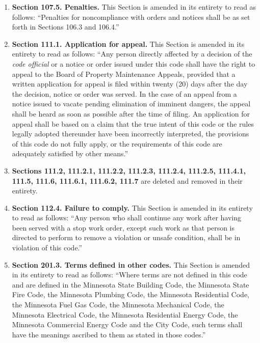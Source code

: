 \begin{enumerate}[{\indent}1)]
    \item \textbf{Section 107.5. Penalties.} This Section is amended in its entirety to read as follows: “Penalties for noncompliance with orders and notices shall be as set forth in Sections 106.3 and 106.4.”
    \item \textbf{Section 111.1. Application for appeal.} This Section is amended in its entirety to read as follows: “Any person directly affected by a decision of the \textit{code official} or a notice or order issued under this code shall have the right to appeal to the Board of Property Maintenance Appeals, provided that a written application for appeal is filed within twenty (20) days after the day the decision, notice or order was served. In the case of an appeal from a notice issued to vacate pending elimination of imminent dangers, the appeal shall be heard as soon as possible after the time of filing. An application for appeal shall be based on a claim that the true intent of this code or the rules legally adopted thereunder have been incorrectly interpreted, the provisions of this code do not fully apply, or the requirements of this code are adequately satisfied by other means.”
    \item \textbf{Sections 111.2, 111.2.1, 111.2.2, 111.2.3, 111.2.4, 111.2.5, 111.4.1, 111.5, 111.6, 111.6.1, 111.6.2, 111.7} are deleted and removed in their entirety.
    \item \textbf{Section 112.4. Failure to comply.} This Section is amended in its entirety to read as follows: “Any person who shall continue any work after having been served with a stop work order, except such work as that person is directed to perform to remove a violation or unsafe condition, shall be in violation of this code.”
    \item \textbf{Section 201.3. Terms defined in other codes.} This Section is amended in its entirety to read as follows: “Where terms are not defined in this code and are defined in the Minnesota State Building Code, the Minnesota State Fire Code, the Minnesota Plumbing Code, the Minnesota Residential Code, the Minnesota Fuel Gas Code, the Minnesota Mechanical Code, the Minnesota Electrical Code, the Minnesota Residential Energy Code, the Minnesota Commercial Energy Code and the City Code, such terms shall have the meanings ascribed to them as stated in those codes.”

\end{enumerate}
